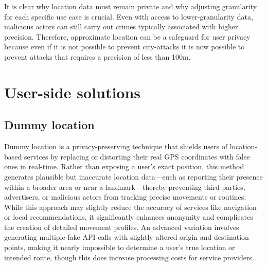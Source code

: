 \documentclass[9pt,conference]{IEEEtran}
\begin{document}

It is clear why location data must remain private and why adjusting granularity for each specific use case is crucial. Even with access to lower-granularity data, malicious actors can still carry out crimes typically associated with higher precision. Therefore,  approximate location can be  a safeguard for user privacy because even if it is not possible to prevent city-attacks it is now possible to prevent attacks that requires a precision of less than 100m.

\section{User-side solutions}

\subsection{Dummy location}
Dummy location is a privacy-preserving technique that shields users of location-based services by replacing or distorting their real GPS coordinates with false ones in real-time. Rather than exposing a user’s exact position, this method generates plausible but inaccurate location data—such as reporting their presence within a broader area or near a landmark—thereby preventing third parties, advertisers, or malicious actors from tracking precise movements or routines. While this approach may slightly reduce the accuracy of services like navigation or local recommendations, it significantly enhances anonymity and complicates the creation of detailed movement profiles. An advanced variation involves generating multiple fake API calls with slightly altered origin and destination points, making it nearly impossible to determine a user’s true location or intended route, though this does increase processing costs for service providers. 
\end{document}
